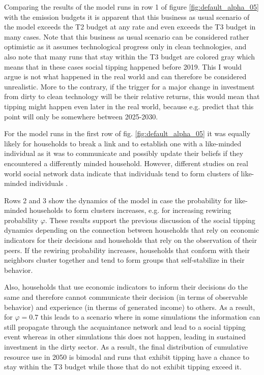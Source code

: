 Comparing the results of the model runs in row 1 of figure \ref{fig:default_alpha_05} with the emission budgets it is apparent that this business as usual scenario of the model exceeds the T2 budget at any rate and even exceeds the T3 budget in many cases. Note that this business as usual scenario can be considered rather optimistic as it assumes technological progress only in clean technologies, and also note that many runs that stay within the T3 budget are colored gray which means that in these cases social tipping happened before 2019. This I would argue is not what happened in the real world and can therefore be considered unrealistic. More to the contrary, if the trigger for a major change in investment from dirty to clean technology will be their relative returns, this would mean that tipping might happen even later in the real world, because e.g. \cite{Farmer2016} predict that this point will only be somewhere between 2025-2030.

For the model runs in the first row of fig. \ref{fig:default_alpha_05} it was equally likely for households to break a link and to establish one with a like-minded individual as it was to communicate and possibly update their beliefs if they encountered a differently minded household. 
However, different studies on real world social network data indicate that individuals tend to form clusters of like-minded individuals \citep{girvan2002community, Lerman2010, Law2011, Takhteyev2012}.

Rows 2 and 3 show the dynamics of the model in case the probability for like-minded households to form clusters increases, e.g. for increasing rewiring probability $\varphi$. These results support the previous discussion of the social tipping dynamics depending on the connection between households that rely on economic indicators for their decisions and households that rely on the observation of their peers. If the rewiring probability increases, households that conform with their neighbors cluster together and tend to form groups that self-stabilize in their behavior.

Also, households that use economic indicators to inform their decisions do the same and therefore cannot communicate their decision (in terms of observable behavior) and experience (in therms of generated income) to others. As a result, for $\varphi=0.7$ this leads to a scenario where in some simulations the information can still propagate through the acquaintance network and lead to a social tipping event whereas in other simulations this does not happen, leading in sustained investment in the dirty sector. As a result, the final distribution of cumulative resource use in 2050 is bimodal and runs that exhibit tipping have a chance to stay within the T3 budget while those that do not exhibit tipping exceed it.

